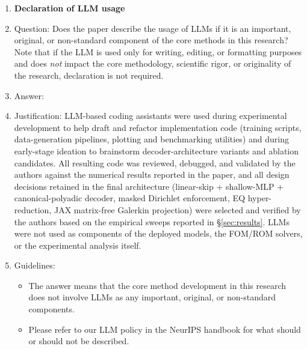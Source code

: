 \begin{enumerate}
\item {\bf Declaration of LLM usage}
    \item[] Question: Does the paper describe the usage of LLMs if it is an important, original, or non-standard component of the core methods in this research? Note that if the LLM is used only for writing, editing, or formatting purposes and does \emph{not} impact the core methodology, scientific rigor, or originality of the research, declaration is not required.
    \item[] Answer: \answerYes{}
    \item[] Justification: LLM-based coding assistants were used during experimental development to help draft and refactor implementation code (training scripts, data-generation pipelines, plotting and benchmarking utilities) and during early-stage ideation to brainstorm decoder-architecture variants and ablation candidates. All resulting code was reviewed, debugged, and validated by the authors against the numerical results reported in the paper, and all design decisions retained in the final architecture (linear-skip + shallow-MLP + canonical-polyadic decoder, masked Dirichlet enforcement, EQ hyper-reduction, JAX matrix-free Galerkin projection) were selected and verified by the authors based on the empirical sweeps reported in \S\ref{sec:results}. LLMs were not used as components of the deployed models, the FOM/ROM solvers, or the experimental analysis itself.
    \item[] Guidelines:
    \begin{itemize}
        \item The answer \answerNA{} means that the core method development in this research does not involve LLMs as any important, original, or non-standard components.
        \item Please refer to our LLM policy in the NeurIPS handbook for what should or should not be described.
    \end{itemize}

\end{enumerate}